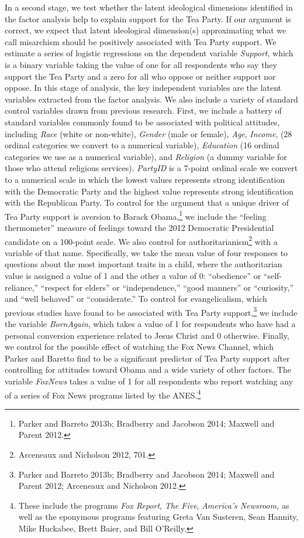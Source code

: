 \documentclass[12pt,]{article}
\begin{document}
In a second stage, we test whether the latent ideological dimensions
identified in the factor analysis help to explain support for the Tea
Party. If our argument is correct, we expect that latent ideological
dimension(s) approximating what we call misarchism should be positively
associated with Tea Party support. We estimate a series of logistic
regressions on the dependent variable \emph{Support}, which is a binary
variable taking the value of one for all respondents who say they
support the Tea Party and a zero for all who oppose or neither support
nor oppose. In this stage of analysis, the key independent variables are
the latent variables extracted from the factor analysis. We also include
a variety of standard control variables drawn from previous research.
First, we include a battery of standard variables commonly found to be
associated with political attitudes, including \emph{Race} (white or
non-white), \emph{Gender} (male or female), \emph{Age}, \emph{Income},
(28 ordinal categories we convert to a numerical variable),
\emph{Education} (16 ordinal categories we use as a numerical variable),
and \emph{Religion} (a dummy variable for those who attend religious
services). \emph{PartyID} is a 7-point ordinal scale we convert to a
numerical scale in which the lowest values represents strong
identification with the Democratic Party and the highest value
represents strong identification with the Republican Party. To control
for the argument that a unique driver of Tea Party support is aversion
to Barack Obama,\footnote{Parker and Barreto 2013b; Bradberry and
  Jacobson 2014; Maxwell and Parent 2012. } we include the ``feeling
thermometer'' measure of feelings toward the 2012 Democratic
Presidential candidate on a 100-point scale. We also control for
authoritarianism\footnote{Arceneaux and Nicholson 2012, 701. } with a
variable of that name. Specifically, we take the mean value of four
responses to questions about the most important traits in a child, where
the authoritarian value is assigned a value of 1 and the other a value
of 0: ``obedience'' or ``self-reliance,'' ``respect for elders'' or
``independence,'' ``good manners'' or ``curiosity,'' and ``well
behaved'' or ``considerate.'' To control for evangelicalism, which
previous studies have found to be associated with Tea Party
support,\footnote{Parker and Barreto 2013b; Bradberry and Jacobson 2014;
  Maxwell and Parent 2012; Arceneaux and Nicholson 2012. } we include
the variable \emph{BornAgain}, which takes a value of 1 for respondents
who have had a personal conversion experience related to Jesus Christ
and 0 otherwise. Finally, we control for the possible effect of watching
the Fox News Channel, which Parker and Baretto find to be a significant
predictor of Tea Party support after controlling for attitudes toward
Obama and a wide variety of other factors. The variable \emph{FoxNews}
takes a value of 1 for all respondents who report watching any of a
series of Fox News programs listed by the ANES.\footnote{These include
  the programs \emph{Fox Report}, \emph{The Five}, \emph{America's
  Newsroom,} as well as the eponymous programs featuring Greta Van
  Susteren, Sean Hannity, Mike Huckabee, Brett Baier, and Bill O'Reilly.}
\end{document}
